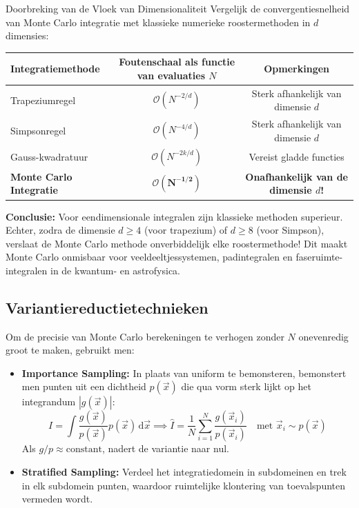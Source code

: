\documentclass[11pt,a4paper]{article}
\newcommand{\dd}{\mathrm{d}}
\begin{document}
\begin{theobox}{Doorbreking van de Vloek van Dimensionaliteit}
Vergelijk de convergentiesnelheid van Monte Carlo integratie met klassieke numerieke roostermethoden in $d$ dimensies:
\begin{table}[H]
    \centering
    \small
    \begin{tabular}{lcc}
        \toprule
        \textbf{Integratiemethode} & \textbf{Foutenschaal als functie van evaluaties $N$} & \textbf{Opmerkingen} \\
        \midrule
        Trapeziumregel & $\mathcal{O}(N^{-2/d})$ & Sterk afhankelijk van dimensie $d$ \\
        Simpsonregel & $\mathcal{O}(N^{-4/d})$ & Sterk afhankelijk van dimensie $d$ \\
        Gauss-kwadratuur & $\mathcal{O}(N^{-2k/d})$ & Vereist gladde functies \\
        \textbf{Monte Carlo Integratie} & $\mathbf{\mathcal{O}(N^{-1/2})}$ & \textbf{Onafhankelijk van de dimensie $d$!} \\
        \bottomrule
    \end{tabular}
\end{table}
\textbf{Conclusie:} Voor eendimensionale integralen zijn klassieke methoden superieur. Echter, zodra de dimensie $d \ge 4$ (voor trapezium) of $d \ge 8$ (voor Simpson), verslaat de Monte Carlo methode onverbiddelijk elke roostermethode! Dit maakt Monte Carlo onmisbaar voor veeldeeltjessystemen, padintegralen en faseruimte-integralen in de kwantum- en astrofysica.
\end{theobox}

\subsection{Variantiereductietechnieken}
Om de precisie van Monte Carlo berekeningen te verhogen zonder $N$ onevenredig groot te maken, gebruikt men:
\begin{itemize}[leftmargin=1.5em]
    \item \textbf{Importance Sampling:} In plaats van uniform te bemonsteren, bemonstert men punten uit een dichtheid $p(\vec{x})$ die qua vorm sterk lijkt op het integrandum $|g(\vec{x})|$:
    \begin{equation}
        I = \int \frac{g(\vec{x})}{p(\vec{x})} p(\vec{x}) \, \dd \vec{x} \implies \hat{I} = \frac{1}{N}\sum_{i=1}^N \frac{g(\vec{x}_i)}{p(\vec{x}_i)} \quad \text{met } \vec{x}_i \sim p(\vec{x})
    \end{equation}
    Als $g/p \approx \text{constant}$, nadert de variantie naar nul.
    \item \textbf{Stratified Sampling:} Verdeel het integratiedomein in subdomeinen en trek in elk subdomein punten, waardoor ruimtelijke klontering van toevalspunten vermeden wordt.
\end{itemize}
\end{document}
